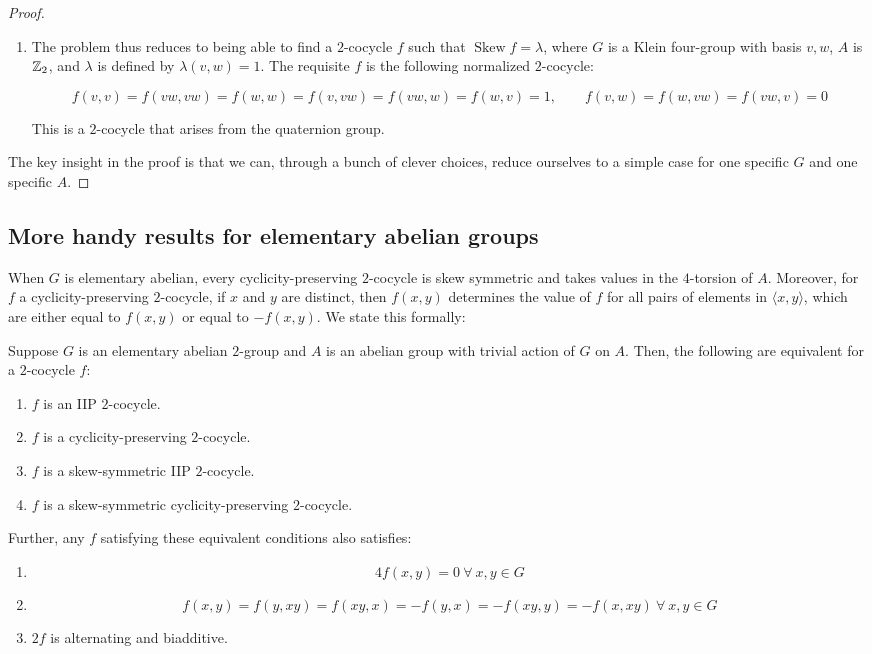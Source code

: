 \documentclass[10pt]{amsart}
\newcommand{\Skew}{\operatorname{Skew}}
\begin{document}
\begin{proof}
\begin{enumerate}
  \item The problem thus reduces to being able to find a $2$-cocycle
    $f$ such that $\Skew f = \lambda$, where $G$ is a Klein four-group
    with basis $v,w$, $A$ is $\mathbb{Z}_2$, and $\lambda$ is defined by
    $\lambda(v,w) = 1$. The requisite $f$ is the following normalized
    $2$-cocycle:

    $$f(v,v) = f(vw,vw) = f(w,w) = f(v,vw) = f(vw,w) = f(w,v) = 1, \qquad f(v,w) = f(w,vw) = f(vw,v) = 0$$

    This is a $2$-cocycle that arises from the quaternion group.
  \end{enumerate}

  The key insight in the proof is that we can, through a bunch of
  clever choices, reduce ourselves to a simple case for one specific
  $G$ and one specific $A$.
\end{proof}

\subsection{More handy results for elementary abelian groups}

When $G$ is elementary abelian, every cyclicity-preserving $2$-cocycle
is skew symmetric and takes values in the $4$-torsion of
$A$. Moreover, for $f$ a cyclicity-preserving $2$-cocycle, if $x$ and
$y$ are distinct, then $f(x,y)$ determines the value of $f$ for all
pairs of elements in $\langle x, y \rangle$, which are either equal to
$f(x,y)$ or equal to $-f(x,y)$. We state this formally:

\begin{lemma}\label{CP2cocycleonelab}
  Suppose $G$ is an elementary abelian $2$-group and $A$ is an abelian
  group with trivial action of $G$ on $A$. Then, the following are
  equivalent for a $2$-cocycle $f$:

  \begin{enumerate}
  \item $f$ is an IIP $2$-cocycle.
  \item $f$ is a cyclicity-preserving $2$-cocycle.
  \item $f$ is a skew-symmetric IIP $2$-cocycle.
  \item $f$ is a skew-symmetric cyclicity-preserving $2$-cocycle.
  \end{enumerate}

  Further, any $f$ satisfying these equivalent conditions also satisfies:

  \begin{enumerate}
  \item $$4f(x,y) = 0 \ \forall \ x,y \in G$$
  \item $$f(x,y) = f(y,xy) = f(xy,x) = -f(y,x) = -f(xy,y) = -f(x,xy) \ \forall \ x,y \in G$$
  \item $2f$ is alternating and biadditive.
  \end{enumerate}
\end{lemma}
\end{document}
